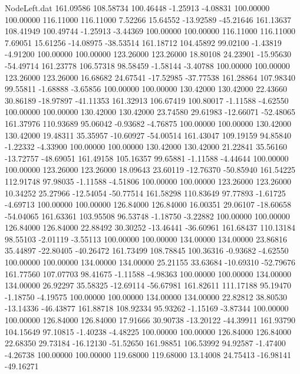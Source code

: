 \begin{filecontents}{NodeLeft.dat}
 161.09586  108.58734  100.46448    -1.25913   -4.08831  100.00000  100.00000  116.11000  116.11000    7.52266   15.64552  -13.92589  -45.21646
 161.13637  108.41949  100.49744    -1.25913   -3.44369  100.00000  100.00000  116.11000  116.11000    7.69051   15.61256  -14.08975  -38.53514
 161.18712  104.45892   99.02100    -1.43819   -4.91200  100.00000  100.00000  123.26000  123.26000   18.80108   24.23901  -15.95630  -54.49714
 161.23778  106.57318   98.58459    -1.58144   -3.40788  100.00000  100.00000  123.26000  123.26000   16.68682   24.67541  -17.52985  -37.77538
 161.28864  107.98340   99.55811    -1.68888   -3.65856  100.00000  100.00000  130.42000  130.42000   22.43660   30.86189  -18.97897  -41.11353
 161.32913  106.67419  100.80017    -1.11588   -4.62550  100.00000  100.00000  130.42000  130.42000   23.74580   29.61983  -12.66071  -52.48065
 161.37976  110.93689   95.06042    -0.93682   -4.76875  100.00000  100.00000  130.42000  130.42000   19.48311   35.35957  -10.60927  -54.00514
 161.43047  109.19159   94.85840    -1.22332   -4.33900  100.00000  100.00000  130.42000  130.42000   21.22841   35.56160  -13.72757  -48.69051
 161.49158  105.16357   99.65881    -1.11588   -4.44644  100.00000  100.00000  123.26000  123.26000   18.09643   23.60119  -12.76370  -50.85940
 161.54225  112.91748   97.98035    -1.11588   -4.51806  100.00000  100.00000  123.26000  123.26000   10.34252   25.27966  -12.54054  -50.77514
 161.58298  110.83649   97.77893    -1.61725   -4.69713  100.00000  100.00000  126.84000  126.84000   16.00351   29.06107  -18.60658  -54.04065
 161.63361  103.95508   96.53748    -1.18750   -3.22882  100.00000  100.00000  126.84000  126.84000   22.88492   30.30252  -13.46441  -36.60961
 161.68437  110.13184   98.55103    -2.01119   -3.55113  100.00000  100.00000  134.00000  134.00000   23.86816   35.44897  -22.80405  -40.26472
 161.73499  108.78845  100.36316    -0.93682   -4.62550  100.00000  100.00000  134.00000  134.00000   25.21155   33.63684  -10.69310  -52.79676
 161.77560  107.07703   98.41675    -1.11588   -4.98363  100.00000  100.00000  134.00000  134.00000   26.92297   35.58325  -12.69114  -56.67981
 161.82611  111.17188   95.19470    -1.18750   -4.19575  100.00000  100.00000  134.00000  134.00000   22.82812   38.80530  -13.14336  -46.43877
 161.88718  108.92334   95.93262    -1.15169   -3.87344  100.00000  100.00000  126.84000  126.84000   17.91666   30.90738  -13.20122  -44.39911
 161.93790  104.15649   97.10815    -1.40238   -4.48225  100.00000  100.00000  126.84000  126.84000   22.68350   29.73184  -16.12130  -51.52650
 161.98851  106.53992   94.92587    -1.47400   -4.26738  100.00000  100.00000  119.68000  119.68000   13.14008   24.75413  -16.98141  -49.16271

\end{filecontents}
